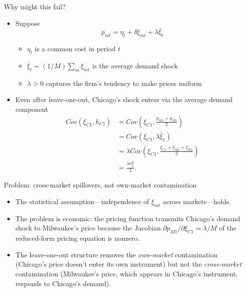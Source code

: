 \documentclass[notes,11pt, aspectratio=169]{beamer}
\begin{document}
\begin{frame}{Why might this fail?}

\begin{itemize}
    \item Suppose 
    \[
     p_{mt} = \eta_t + \delta \xi_{mt} + \lambda \bar{\xi}_t
    \]
    \begin{itemize}
        \item $\eta_t$ is a common cost in period $t$
        \item $\bar{\xi}_t = (1/M)\sum_m \xi_{mt}$ is the average demand shock
        \item $\lambda > 0$ captures the firm's tendency to make prices uniform
    \end{itemize} 

    \vspace{.2cm}

    \item Even after leave-one-out, Chicago’s shock enters via the average demand component 
    \begin{align*}
    Cov(\xi_{C1}, h_{C1}) &= Cov\left(\xi_{C1}, \frac{p_{M1} + p_{D1}}{2}\right) \\
      &= Cov\left(\xi_{C1}, \lambda \bar{\xi}_1\right) \\
    &= \lambda Cov\left(\xi_{C1}, \frac{\xi_{C1} + \xi_{M1} + \xi_{D1}}{3}\right) \\
    &= \frac{\lambda \sigma_\xi^2}{3}.
\end{align*}
\end{itemize}
    
\end{frame}

\begin{frame}{Problem: cross-market spillovers, not own-market contamination}

\begin{itemize}
    \item The statistical assumption—independence of $\xi_{mt}$ across markets—holds. 
    \item The problem is economic: the pricing function transmits Chicago's demand shock to Milwaukee's price because the Jacobian $\partial p_{M1}/\partial \xi_{C1} = \lambda/M$ of the reduced-form pricing equation is nonzero. 
    \item The leave-one-out structure removes the \emph{own-market} contamination (Chicago's price doesn't enter its own instrument) but not the \emph{cross-market} contamination (Milwaukee's price, which appears in Chicago's instrument, responds to Chicago's demand).
\end{itemize}
    
\end{frame}
\end{document}
